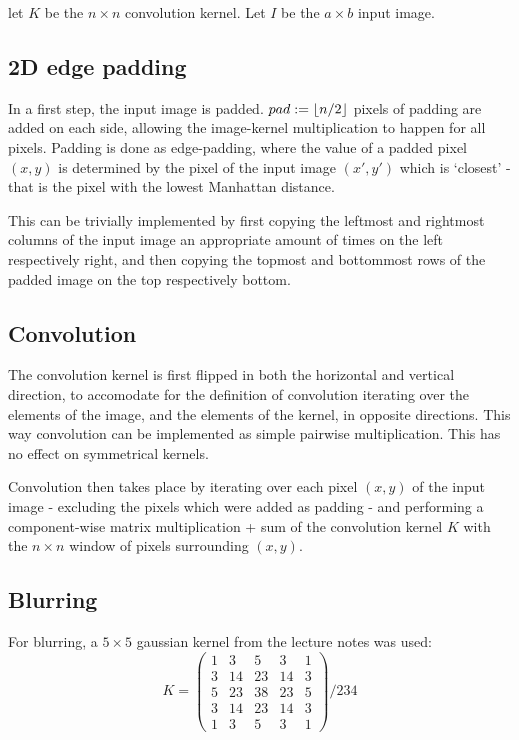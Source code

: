 \documentclass[a4paper]{scrreprt}
\DeclarePairedDelimiter\floor{\lfloor}{\rfloor}
\begin{document}
let $K$ be the $n \times n$ convolution kernel. Let $I$ be the $a \times b$ input
image.

\subsection{2D edge padding}

In a first step, the input image is padded. $pad := \floor{n / 2}$ pixels of
padding are added on each side, allowing the image-kernel multiplication to
happen for all pixels. Padding is done as edge-padding, where the value of a
padded pixel $(x, y)$ is determined by the pixel of the input image $(x', y')$
which is `closest' - that is the pixel with the lowest Manhattan distance.

This can be trivially implemented by first copying the leftmost and rightmost
columns of the input image an appropriate amount of times on the left
respectively right, and then copying the topmost and bottommost rows of the
padded image on the top respectively bottom.

\subsection{Convolution}

The convolution kernel is first flipped in both the horizontal and vertical
direction, to accomodate for the definition of convolution iterating over the
elements of the image, and the elements of the kernel, in opposite directions.
This way convolution can be implemented as simple pairwise multiplication. This
has no effect on symmetrical kernels.

Convolution then takes place by iterating over each pixel $(x, y)$ of the input
image - excluding the pixels which were added as padding - and performing a
component-wise matrix multiplication + sum of the convolution kernel $K$ with
the $n \times n$ window of pixels surrounding $(x, y)$.

\subsection{Blurring}

For blurring, a $5 \times 5$ gaussian kernel from the lecture notes was used:
\[
		K = \begin{pmatrix}
				1 & 3 & 5 & 3 & 1 \\
				3 & 14 & 23 & 14 & 3 \\
				5 & 23 & 38 & 23 & 5 \\
				3 & 14 & 23 & 14 & 3 \\
				1 & 3 & 5 & 3 & 1
		\end{pmatrix} / 234
\]
\end{document}
